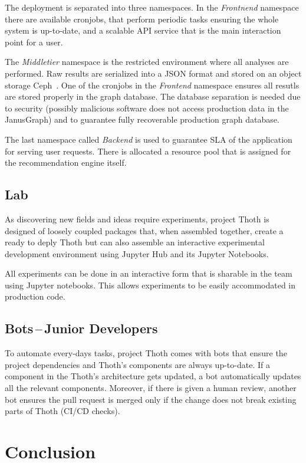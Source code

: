 \documentclass[a4paper]{llncs}
\begin{document}
The deployment is separated into three namespaces. In the \emph{Frontnend} namespace there are available cronjobs, that perform periodic tasks ensuring the whole system is up-to-date, and a scalable API service that is the main interaction point for a user.

The \emph{Middletier} namespace is the restricted environment where all analyses are performed. Raw results are serialized into a JSON format and stored on an object storage Ceph~\cite{ref_ceph}. One of the cronjobs in the \emph{Frontend} namespace ensures all resutls are stored properly in the graph database. The database separation is needed due to security (possibly malicious software does not access production data in the JanusGraph) and to guarantee fully recoverable production graph database.

The last namespace called \emph{Backend} is used to guarantee SLA of the application for serving user requests. There is allocated a resource pool that is assigned for the recommendation engine itself.

\subsection{Lab}

As discovering new fields and ideas require experiments, project Thoth is designed of loosely coupled packages that, when assembled together, create a ready to deply Thoth but can also assemble an interactive experimental development environment using Jupyter Hub and its Jupyter Notebooks.

All experiments can be done in an interactive form that is sharable in the team using Jupyter notebooks. This allows experiments to be easily accommodated in production code.

\subsection{Bots\,--\,Junior Developers}

To automate every-days tasks, project Thoth comes with bots that ensure the project dependencies and Thoth's components are always up-to-date. If a component in the Thoth's architecture gets updated, a bot automatically updates all the relevant components. Moreover, if there is given a human review, another bot ensures the pull request is merged only if the change does not break existing parts of Thoth (CI/CD checks).

\section{Conclusion}
\end{document}
